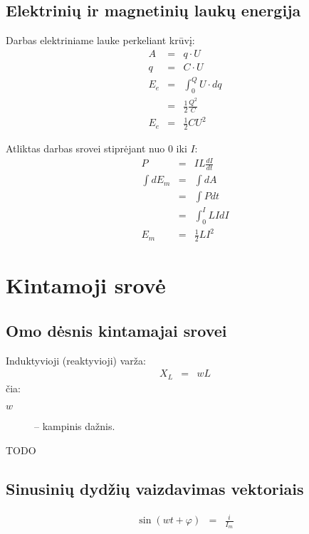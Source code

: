 \section{Elektrinių ir magnetinių laukų energija}

Darbas elektriniame lauke perkeliant krūvį:
\begin{align*}
  A &=& q \cdot U \\
  q &=& C \cdot U \\
  E_{e} &=& \int _{0} ^{Q} U \cdot dq \\
  &=& \frac{1}{2} \frac{Q^2}{C} \\
  E_{e} &=& \frac{1}{2} C U^{2}
\end{align*}

Atliktas darbas srovei stiprėjant nuo 0 iki $I$:
\begin{align*}
  P &=& I L \frac{dI}{dt} \\
  \int d E_{m} &=& \int d A \\
  &=& \int P dt \\
  &=& \int _{0} ^{I} L I dI \\
  E_{m} &=& \frac{1}{2} L I^{2}
\end{align*}

\chapter{Kintamoji srovė}

\section{Omo dėsnis kintamajai srovei}

Induktyvioji (reaktyvioji) varža:
\begin{align*}
  X_{L} &=& w L
\end{align*}
čia:
\begin{description}
  \item[$w$] – kampinis dažnis.
\end{description}

\begin{defn}
  TODO
\end{defn}

\section{Sinusinių dydžių vaizdavimas vektoriais}

\begin{align*}
  \sin (wt + \varphi) &=& \frac{i}{I_{m}} \\
\end{align*}
